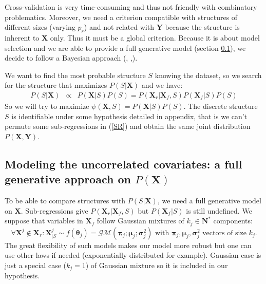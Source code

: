 \documentclass[11pt,a4paper]{article}
\begin{document}
Cross-validation is very time-consuming and thus not friendly with combinatory problematics. Moreover, we need a criterion compatible with structures of different sizes (varying $p_r$) and not related with $\boldsymbol{Y}$ because the structure is inherent to $\boldsymbol{X}$ only. Thus it must be a global criterion. 	
Because it is about model selection and we are able to provide a full generative model (section \ref{sectionfullgen}), we decide to follow a Bayesian approach (\cite{raftery1995bayesian}, \cite{andrieu1999joint},\cite{chipman2001practical}).  
	
We want to find the most probable structure $S$ knowing the dataset, so we search for the structure that maximizes $P(S|\boldsymbol{X})$ and we have:	
	\begin{eqnarray}
	 \label{approxBIC} P(S|\boldsymbol{X})&\propto & P(\boldsymbol{X}|S)P(S)
	=P(\boldsymbol{X}_r|\boldsymbol{X}_f,S)P(\boldsymbol{X}_f|S)P(S)
	\end{eqnarray}
So we will try to maximize $\psi(\boldsymbol{X},S)=P(\boldsymbol{X}|S)P(S)$.
	The discrete structure $S$ is identifiable under some hypothesis detailed in appendix, that is we can't permute some sub-regressions in (\ref{SR}) and obtain the same joint distribution $P(\boldsymbol{X},\boldsymbol{Y})$.

	\subsection{Modeling the uncorrelated covariates: a full generative approach on $P(\boldsymbol{X})$} \label{sectionfullgen}
	To be able to compare structures with $P(S|\boldsymbol{X})$, we need a full generative model on $\boldsymbol{X}$. Sub-regressions give $P(\boldsymbol{X}_r|\boldsymbol{X}_f,S) $ but $P(\boldsymbol{X}_f|S)$ is still undefined. We suppose that variables in $\boldsymbol{X}_f$ follow Gaussian mixtures of $k_j \in \mathbf{N}^*$ components: 
	\begin{equation}
			\forall \boldsymbol{X}^j \notin \boldsymbol{X}_r : \boldsymbol{X}^j_{|S} \sim f(\boldsymbol{\theta}_j)=\mathcal{GM}(\boldsymbol{\pi}_j;\boldsymbol{\mu}_j;\boldsymbol{\sigma}^2_j) \textrm{ with } \boldsymbol{\pi}_j,\boldsymbol{\mu}_j,\boldsymbol{\sigma}^2_j \textrm{ vectors of size } k_j. \label{mixtureX1}
		\end{equation}
		The great flexibility \cite{mclachlan2004finite} of such models makes our model more robust but one can use other laws if needed (exponentially distributed for example). Gaussian case is just a special case ($k_j=1$) of Gaussian mixture so it is included in our hypothesis.
\end{document}
